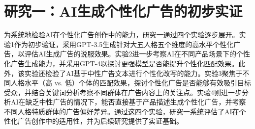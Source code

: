 \chapter{研究一：AI生成个性化广告的初步实证}

为系统地检验AI在个性化广告创作中的能力，研究一通过四个实验逐步展开。实验1作为初步验证，采用GPT-3.5生成针对大五人格五个维度的高水平个性化广告，以评估AI生成广告的说服效果。实验2进一步考察AI在不同产品场景下的个性化广告生成能力，并采用GPT-4以探讨更强模型是否能提升个性化匹配效果。此外，该实验还检验了AI基于中性广告文本进行个性化改写的能力。实验3聚焦于不同人格水平（高 vs. 低）个体的匹配效果，探讨个性化广告是否能够有效吸引目标受众，并结合关键词分析考察不同群体在广告内容上的关注点。实验4则进一步分析AI在缺乏中性广告的情况下，能否直接基于产品描述生成个性化广告，并考察不同人格特质群体的广告偏好差异。通过这四个实验，研究一系统评估了AI在个性化广告创作中的适用性，并为后续研究提供了实证基础。





